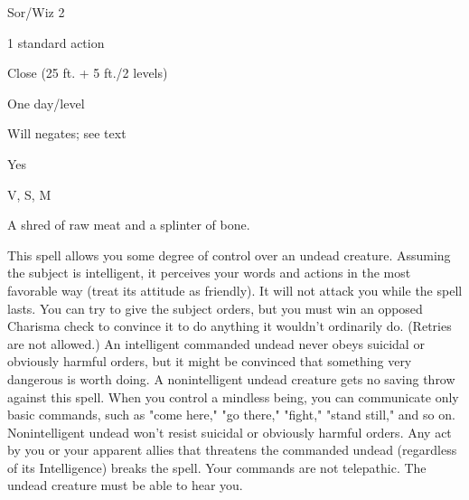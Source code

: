 
\begin{description*}
\item[Level:] Sor/Wiz 2
\item[Casting Time:] 1 standard action
\item[Range:] Close (25 ft. + 5 ft./2 levels)
\item[Duration:] One day/level
\item[Saving Throw:] Will negates; see text
\item[Spell Resistance:] Yes
\item[Components:] V, S, M
\item[Arcane Material Component:] A shred of raw meat and a splinter of bone.
\end{description*}

This spell allows you some degree of control over an undead creature. Assuming
the subject is intelligent, it perceives your words and actions in the most favorable
way (treat its attitude as friendly). It will not attack you while the spell lasts.
You can try to give the subject orders, but you must win an opposed Charisma check
to convince it to do anything it wouldn't ordinarily do. (Retries are not allowed.)
An intelligent commanded undead never obeys suicidal or obviously harmful orders,
but it might be convinced that something very dangerous is worth doing.
A nonintelligent undead creature gets no saving throw against this spell. When
you control a mindless being, you can communicate only basic commands, such as
"come here," "go there," "fight," "stand still," and so on. Nonintelligent
undead won't resist suicidal or obviously harmful orders.
Any act by you or your apparent allies that threatens the commanded undead (regardless
of its Intelligence) breaks the spell.
Your commands are not telepathic. The undead creature must be able to hear you.